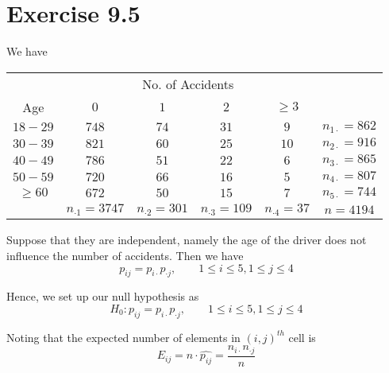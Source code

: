 \documentclass[13pt]{article}
\begin{document}
\section*{Exercise 9.5}
\par We have 
\begin{table}[H]
    \centering
    \begin{tabular}{c | cccc | c}
        \toprule
        & \multicolumn{4}{c}{No. of Accidents} &  \\ \cline{2-5}
        Age & $0$ & $1$ & $2$ & $\geq 3$ & \\
        \midrule
        $18 - 29$ & $748$ & $74$ & $31$ & $9 $ & $n_{1\cdot} = 862$\\
        $30 - 39$ & $821$ & $60$ & $25$ & $10$ & $n_{2\cdot} = 916$\\
        $40 - 49$ & $786$ & $51$ & $22$ & $6 $ & $n_{3\cdot} = 865$\\
        $50 - 59$ & $720$ & $66$ & $16$ & $5 $ & $n_{4\cdot} = 807$\\
        $\geq 60$ & $672$ & $50$ & $15$ & $7 $ & $n_{5\cdot} = 744$\\
        \midrule
        & $n_{\cdot 1} = 3747$ & $n_{\cdot 2} = 301$ & $n_{\cdot 3} = 109$ & $n_{\cdot 4} = 37$ & $n = 4194$\\
    \end{tabular}
\end{table}

\par Suppose that they are independent, namely the age of the driver does not influence the number of accidents. Then we have 
\begin{equation*}
    p_{ij} = p_{i\cdot}p_{\cdot j}, \qquad 1\leq i\leq 5, 1\leq j\leq 4
\end{equation*}

\par Hence, we set up our null hypothesis as 
\begin{equation*}
    H_0 : p_{ij} = p_{i\cdot}p_{\cdot j}, \qquad 1\leq i\leq 5, 1\leq j\leq 4
\end{equation*}

\par Noting that the expected number of elements in $(i,j)^{th}$ cell is 
\begin{equation*}
    E_{ij} = n\cdot \widehat{p_{ij}} = \frac{n_{i\cdot}n_{\cdot j}}{n}
\end{equation*}
\end{document}
